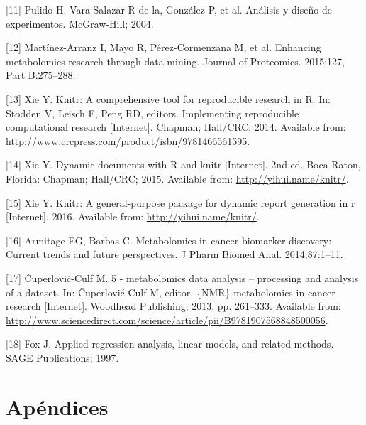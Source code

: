 \documentclass[12pt,spanish,a4paper]{article}
\numberwithin{equation}{section}
\begin{document}
\leavevmode\hypertarget{ref-pulido2004}{}%
{[}11{]} Pulido H, Vara Salazar R de la, González P, et al. Análisis y
diseño de experimentos. McGraw-Hill; 2004.

\leavevmode\hypertarget{ref-martinezarranz2015}{}%
{[}12{]} Martínez-Arranz I, Mayo R, Pérez-Cormenzana M, et al. Enhancing
metabolomics research through data mining. Journal of Proteomics.
2015;127, Part B:275--288.

\leavevmode\hypertarget{ref-xie2014}{}%
{[}13{]} Xie Y. Knitr: A comprehensive tool for reproducible research in
R. In: Stodden V, Leisch F, Peng RD, editors. Implementing reproducible
computational research {[}Internet{]}. Chapman; Hall/CRC; 2014.
Available from:
\url{http://www.crcpress.com/product/isbn/9781466561595}.

\leavevmode\hypertarget{ref-xie2015}{}%
{[}14{]} Xie Y. Dynamic documents with R and knitr {[}Internet{]}. 2nd
ed. Boca Raton, Florida: Chapman; Hall/CRC; 2015. Available from:
\url{http://yihui.name/knitr/}.

\leavevmode\hypertarget{ref-xie2016package}{}%
{[}15{]} Xie Y. Knitr: A general-purpose package for dynamic report
generation in r {[}Internet{]}. 2016. Available from:
\url{http://yihui.name/knitr/}.

\leavevmode\hypertarget{ref-armitage2014}{}%
{[}16{]} Armitage EG, Barbas C. Metabolomics in cancer biomarker
discovery: Current trends and future perspectives. J Pharm Biomed Anal.
2014;87:1--11.

\leavevmode\hypertarget{ref-miroslava2013}{}%
{[}17{]} Čuperlović-Culf M. 5 - metabolomics data analysis -- processing
and analysis of a dataset. In: Čuperlović-Culf M, editor. \{NMR\}
metabolomics in cancer research {[}Internet{]}. Woodhead Publishing;
2013. pp. 261--333. Available from:
\url{http://www.sciencedirect.com/science/article/pii/B9781907568848500056}.

\leavevmode\hypertarget{ref-fox1997}{}%
{[}18{]} Fox J. Applied regression analysis, linear models, and related
methods. SAGE Publications; 1997.

% 
%

\clearpage

\section{Apéndices}


\end{document}
